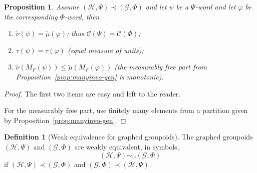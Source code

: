 \documentclass[10pt]{amsart}
\newtheorem{prop}[cdrthm]{Proposition}
\theoremstyle{definition}
\newtheorem{defi}[cdrthm]{Definition}
\newcommand{\cost}{\mathcal{C}}
\newcommand{\ch}{\mathcal{H}}
\newcommand{\cg}{\mathcal{G}}
\newcommand{\ph}{\varphi}
\begin{document}
\begin{prop}\label{prop:properties weak-contain graphings}
Assume $(\ch,\Psi) \prec (\cg, \Phi)$ and let $\psi$ be a $\Psi$-word and let $\ph$ be the corresponding $\Phi$-word, then
\begin{enumerate}
\item \label{prop3.19.1}$\widetilde\nu(\psi)=\widetilde\mu(\varphi)$; thus $\cost(\Psi)=\cost(\Phi)$;


\item \label{prop3.19.2}$\tau(\psi)=\tau(\ph)$ (equal measure of units);

\item \label{prop3.19.3}$\widetilde \nu(M_F(\psi))\leq \widetilde \mu(M_F(\ph))$ (the measurably free part from Proposition~\ref{prop:manyinvo-gen} is monotonic).
\end{enumerate}
\end{prop}
\begin{proof}
The first two items are easy and left to the reader.

For the measurably free part, use finitely many elements from a partition given by Proposition~\ref{prop:manyinvo-gen}.
\end{proof}

\begin{defi}[Weak equivalence for graphed groupoids]\label{def: wek-equiv graphed groupoid}
The graphed grou\-poids $(\ch,\Psi)$ and $(\cg, \Phi)$ are weakly equivalent, in symbols,
\[
(\ch,\Psi) \sim_{w} (\cg, \Phi)
\]
if $(\ch,\Psi) \prec (\cg, \Phi)$ and $(\cg, \Phi)\prec (\ch,\Psi) $.
\end{defi}
\end{document}
